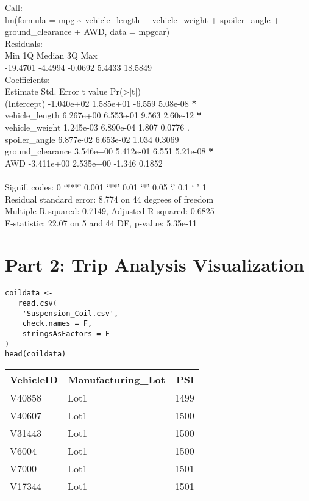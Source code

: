 \documentclass[11pt]{article}
\begin{document}
\begin{org}


Call:\\
lm(formula = mpg \textasciitilde{} vehicle\_length + vehicle\_weight + spoiler\_angle +\\
    ground\_clearance + AWD, data = mpgcar)\\

Residuals:\\
     Min       1Q   Median       3Q      Max\\
-19.4701  -4.4994  -0.0692   5.4433  18.5849\\

Coefficients:\\
                   Estimate Std. Error t value Pr(>|t|)\\
(Intercept)      -1.040e+02  1.585e+01  -6.559 5.08e-08 \textbf{*}\\
vehicle\_length    6.267e+00  6.553e-01   9.563 2.60e-12 \textbf{*}\\
vehicle\_weight    1.245e-03  6.890e-04   1.807   0.0776 .\\
spoiler\_angle     6.877e-02  6.653e-02   1.034   0.3069\\
ground\_clearance  3.546e+00  5.412e-01   6.551 5.21e-08 \textbf{*}\\
AWD              -3.411e+00  2.535e+00  -1.346   0.1852\\
---\\
Signif. codes:  0 ‘***’ 0.001 ‘**’ 0.01 ‘*’ 0.05 ‘.’ 0.1 ‘ ’ 1\\

Residual standard error: 8.774 on 44 degrees of freedom\\
Multiple R-squared:  0.7149,	Adjusted R-squared:  0.6825\\
F-statistic: 22.07 on 5 and 44 DF,  p-value: 5.35e-11\\
\end{org}

\section{Part 2: Trip Analysis Visualization}
\label{sec:org9d7923a}

\begin{verbatim}
coildata <-
   read.csv(
    'Suspension_Coil.csv',
    check.names = F,
    stringsAsFactors = F
)
head(coildata)
\end{verbatim}

\begin{org}
\begin{center}
\begin{tabular}{llr}
VehicleID & Manufacturing\_Lot & PSI\\
\hline
V40858 & Lot1 & 1499\\
V40607 & Lot1 & 1500\\
V31443 & Lot1 & 1500\\
V6004 & Lot1 & 1500\\
V7000 & Lot1 & 1501\\
V17344 & Lot1 & 1501\\
\end{tabular}
\end{center}
\end{org}
\end{document}
